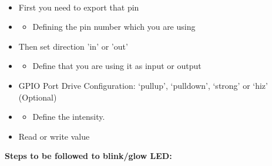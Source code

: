 \documentclass[11pt,a4paper]{article}
\newcommand\tab[1][1cm]{\hspace*{#1}}
\begin{document}
\tab{For that there is some steps tobe followed,}\\
\begin{itemize}
	\item First you need to export that pin
    \item \begin{itemize}
	\item Defining the pin number which you are using 
\end{itemize}

	\item Then set direction 'in' or 'out'
    \item \begin{itemize}
	\item Define that you are using it as input or output
\end{itemize}

	\item GPIO Port Drive Configuration: ‘pullup’, ‘pulldown’, ‘strong’ or ‘hiz’ (Optional)
    \item \begin{itemize}
	\item Define the intensity.
\end{itemize}

	\item Read or write value

\end{itemize}
\newpage
\textbf{Steps to be followed to blink/glow LED:}\\
\end{document}
